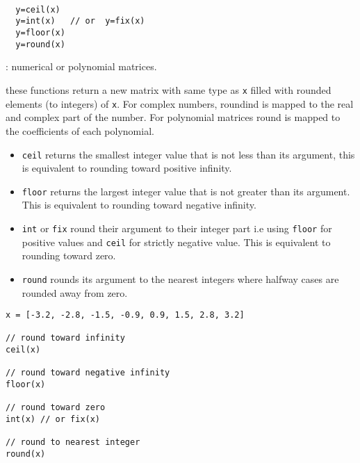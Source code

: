 \begin{mandesc} 
   \\
  \\
   \\
\end{mandesc}
\begin{calling_sequence}
\begin{verbatim}
  y=ceil(x)  
  y=int(x)   // or  y=fix(x)
  y=floor(x)  
  y=round(x)  
\end{verbatim}
\end{calling_sequence}
\begin{parameters}
  \begin{varlist}
    : numerical or polynomial matrices.
  \end{varlist}
\end{parameters}
\begin{mandescription}
  these functions return a new matrix with same type as \verb!x! filled 
  with rounded elements (to integers) of \verb!x!. For complex numbers, roundind is mapped to the 
  real and complex part of the number. For polynomial matrices round is 
  mapped to the  coefficients of each polynomial.
  \begin{itemize}
  \item \verb!ceil! returns the smallest integer value that is not less than its
    argument, this is equivalent to rounding toward positive infinity.
  \item \verb!floor! returns the largest integer value that is not greater than
    its argument. This is equivalent to rounding toward negative infinity.
  \item \verb!int! or \verb!fix! round their argument to their integer part i.e using \verb!floor! for 
    positive values and \verb!ceil! for strictly negative value. This is equivalent to rounding toward zero.
  \item \verb!round! rounds its argument to the nearest integers where halfway cases are rounded
    away from zero.
  \end{itemize}
\end{mandescription}

\begin{examples}
  \begin{Verbatim}
x = [-3.2, -2.8, -1.5, -0.9, 0.9, 1.5, 2.8, 3.2]

// round toward infinity
ceil(x)

// round toward negative infinity
floor(x)

// round toward zero
int(x) // or fix(x)

// round to nearest integer
round(x)   
  \end{Verbatim}
\end{examples}
